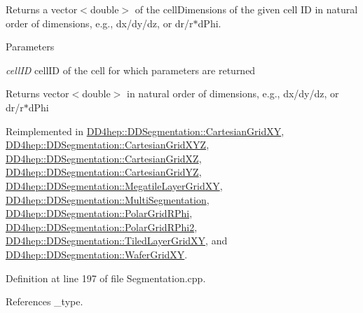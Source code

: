 Returns a vector$<$double$>$ of the cellDimensions of the given cell ID in natural order of dimensions, e.g., dx/dy/dz, or dr/r$\ast$dPhi. 
\begin{DoxyParams}{Parameters}
\item[{\em cellID}]cellID of the cell for which parameters are returned \end{DoxyParams}
\begin{DoxyReturn}{Returns}
vector$<$double$>$ in natural order of dimensions, e.g., dx/dy/dz, or dr/r$\ast$dPhi 
\end{DoxyReturn}


Reimplemented in \hyperlink{class_d_d4hep_1_1_d_d_segmentation_1_1_cartesian_grid_x_y_a34189fa472ffda38fc7d865df8412ba0}{DD4hep::DDSegmentation::CartesianGridXY}, \hyperlink{class_d_d4hep_1_1_d_d_segmentation_1_1_cartesian_grid_x_y_z_a6a1df52f930ef7fea680bfd532d0b6cb}{DD4hep::DDSegmentation::CartesianGridXYZ}, \hyperlink{class_d_d4hep_1_1_d_d_segmentation_1_1_cartesian_grid_x_z_a83908aef5a6fff44c188ce6515a88856}{DD4hep::DDSegmentation::CartesianGridXZ}, \hyperlink{class_d_d4hep_1_1_d_d_segmentation_1_1_cartesian_grid_y_z_a8422ef9feccf16729b9c3b2e63a284a7}{DD4hep::DDSegmentation::CartesianGridYZ}, \hyperlink{class_d_d4hep_1_1_d_d_segmentation_1_1_megatile_layer_grid_x_y_a43b169f4cb6546098e427c6d43db66cf}{DD4hep::DDSegmentation::MegatileLayerGridXY}, \hyperlink{class_d_d4hep_1_1_d_d_segmentation_1_1_multi_segmentation_a2762cc8dd45fdfcab8aa8dfaea47e7fd}{DD4hep::DDSegmentation::MultiSegmentation}, \hyperlink{class_d_d4hep_1_1_d_d_segmentation_1_1_polar_grid_r_phi_a4f443aab6b49eb7bb6a831fd9fd908ee}{DD4hep::DDSegmentation::PolarGridRPhi}, \hyperlink{class_d_d4hep_1_1_d_d_segmentation_1_1_polar_grid_r_phi2_a15d4dfe8784e9ec12a6d801231925b12}{DD4hep::DDSegmentation::PolarGridRPhi2}, \hyperlink{class_d_d4hep_1_1_d_d_segmentation_1_1_tiled_layer_grid_x_y_a5304d34d8b7bb2eb0a187a595796de31}{DD4hep::DDSegmentation::TiledLayerGridXY}, and \hyperlink{class_d_d4hep_1_1_d_d_segmentation_1_1_wafer_grid_x_y_ae063a2a9a60e5965a12cc3c18b851dab}{DD4hep::DDSegmentation::WaferGridXY}.

Definition at line 197 of file Segmentation.cpp.

References \_\-type.


